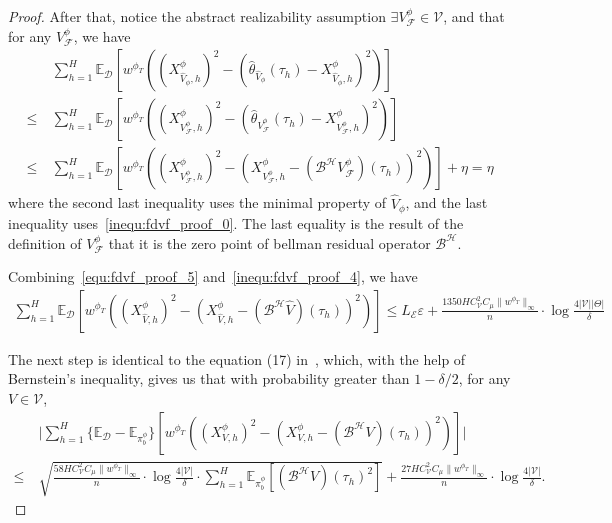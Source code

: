 \documentclass[twoside]{article}
\newcommand{\CAL}[1]{\mathcal{#1}}
\begin{document}
\begin{proof}
After that, notice the abstract realizability assumption $\exists V_{\CAL{F}}^\phi\in\CAL{V}$, and that for any $V_{\CAL{F}}^\phi$, we have
\begin{align}
    &\ \sum_{h=1}^H\mathbb{E}_{\CAL{D}}[w^{\phi_T}((X_{\hat{V}_\phi,h}^\phi)^2-(\hat{\theta}_{\hat{V}_\phi}(\tau_h)-X_{\hat{V}_\phi,h}^\phi)^2)]\nonumber\\\leq&\  \sum_{h=1}^H\mathbb{E}_{\CAL{D}}[w^{\phi_T}((X_{V_{\CAL{F}}^\phi,h}^\phi)^2-(\hat{\theta}_{V_{\CAL{F}}^\phi}(\tau_h)-X_{V_{\CAL{F}}^\phi,h}^\phi)^2)]\\
    \leq&\  \sum_{h=1}^H\mathbb{E}_{\CAL{D}}[w^{\phi_T}((X_{V_{\CAL{F}}^\phi,h}^\phi)^2-(X_{V_{\CAL{F}}^\phi,h}^\phi-(\CAL{B^H}V_{\CAL{F}}^\phi)(\tau_h))^2)]+\eta=\eta\label{equ:fdvf_proof_5}
\end{align}
where the second last inequality uses the minimal property of $\hat{V}_\phi$, and the last inequality uses~\eqref{inequ:fdvf_proof_0}. The last equality is the result of the definition of $V_{\CAL{F}}^\phi$ that it is the zero point of bellman residual operator $\CAL{B^H}$.

Combining~\eqref{equ:fdvf_proof_5} and~\eqref{inequ:fdvf_proof_4}, we have
\begin{align}
    \sum_{h=1}^H\mathbb{E}_{\CAL{D}}[w^{\phi_T}((X_{\hat{V},h}^\phi)^2-(X_{\hat{V},h}^\phi-(\CAL{B^H}\hat{V})(\tau_h))^2)]\leq L_\CAL{E}\varepsilon+\frac{1350HC_{\CAL{V}}^2C_\mu\|w^{\phi_T}\|_\infty}{n}\cdot\log\frac{4|\CAL{V}||\Theta|}{\delta}\label{inequ:fdvf_proof_6}
\end{align}

The next step is identical to the equation (17) in~\cite{zhang2024cursesfuturehistoryfuturedependent}, which, with the help of Bernstein's inequality, gives us that with probability greater than $1-\delta/2$, for any $V\in\CAL{V}$,
\begin{align}
    &\ \bigg|
    \sum_{h=1}^H\{\mathbb{E}_{\CAL{D}}-\mathbb{E}_{\pi_b^\phi}\}[w^{\phi_T}((X_{V,h}^\phi)^2-(X_{V,h}^\phi-(\CAL{B^H}V)(\tau_h))^2)]
    \bigg|\nonumber\\
    \leq&\ \sqrt{\frac{58HC_{\CAL{V}}^2C_\mu\|w^{\phi_T}\|_\infty}{n}\cdot\log\frac{4|\CAL{V}|}{\delta}\cdot \sum_{h=1}^H\mathbb{E}_{\pi_b^\phi}[(\CAL{B^H}V)(\tau_h)^2]}+\frac{27HC_{\CAL{V}}^2C_\mu\|w^{\phi_T}\|_\infty}{n}\cdot\log\frac{4|\CAL{V}|}{\delta}\label{inequ:fdvf_proof_7}.
\end{align}


\end{proof}
\end{document}
